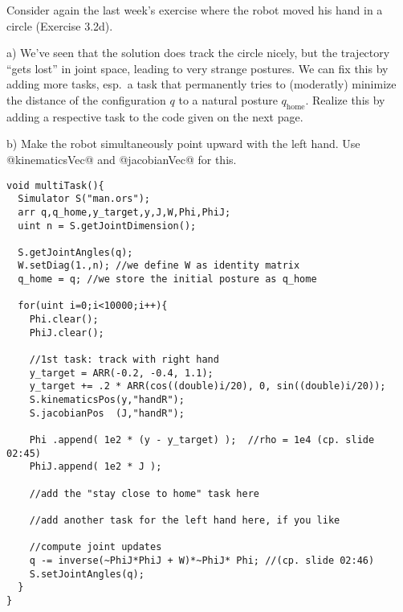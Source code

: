 



Consider again the last week's exercise where the robot moved his hand
in a circle (Exercise 3.2d).

a) We've seen that the solution does track the circle nicely, but the
trajectory ``gets lost'' in joint space, leading to very strange
postures. We can fix this by adding more tasks, esp.\ a task that
permanently tries to (moderatly) minimize the distance of the
configuration $q$ to a natural posture $q_\text{home}$. Realize this
by adding a respective task to the code given on the next page.

b) Make the robot simultaneously point upward with the left hand. Use 
@kinematicsVec@ and @jacobianVec@ for this.

\newpage

\begin{code}\begin{verbatim}
void multiTask(){
  Simulator S("man.ors");
  arr q,q_home,y_target,y,J,W,Phi,PhiJ;
  uint n = S.getJointDimension();

  S.getJointAngles(q);
  W.setDiag(1.,n); //we define W as identity matrix
  q_home = q; //we store the initial posture as q_home

  for(uint i=0;i<10000;i++){
    Phi.clear();
    PhiJ.clear();

    //1st task: track with right hand
    y_target = ARR(-0.2, -0.4, 1.1); 
    y_target += .2 * ARR(cos((double)i/20), 0, sin((double)i/20)); 
    S.kinematicsPos(y,"handR");
    S.jacobianPos  (J,"handR");

    Phi .append( 1e2 * (y - y_target) );  //rho = 1e4 (cp. slide 02:45)
    PhiJ.append( 1e2 * J );

    //add the "stay close to home" task here
    
    //add another task for the left hand here, if you like

    //compute joint updates
    q -= inverse(~PhiJ*PhiJ + W)*~PhiJ* Phi; //(cp. slide 02:46)
    S.setJointAngles(q);
  }
}
\end{verbatim}\end{code}


